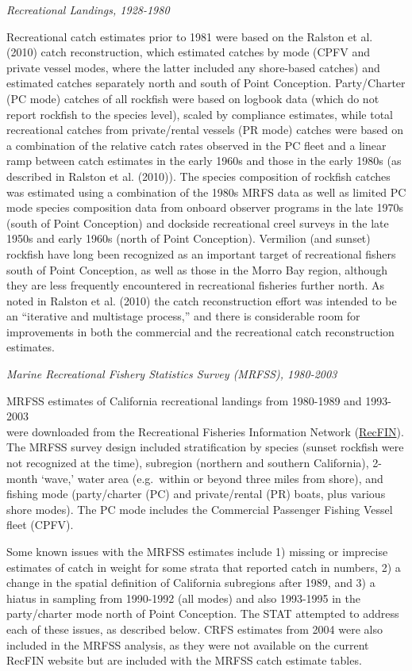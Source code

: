 \documentclass[
  english,
  a4paper,
]{article}
\begin{document}
\emph{Recreational Landings, 1928-1980}

Recreational catch estimates prior to 1981 were based on the Ralston et al. (2010) catch reconstruction, which estimated catches by mode (CPFV and private vessel modes, where the latter included any shore-based catches) and estimated catches separately north and south of Point Conception. Party/Charter (PC mode) catches of all rockfish were based on logbook data (which do not report rockfish to the species level), scaled by compliance estimates, while total recreational catches from private/rental vessels (PR mode) catches were based on a combination of the relative catch rates observed in the PC fleet and a linear ramp between catch estimates in the early 1960s and those in the early 1980s (as described in Ralston et al. (2010)). The species composition of rockfish catches was estimated using a combination of the 1980s MRFS data as well as limited PC mode species composition data from onboard observer programs in the late 1970s (south of Point Conception) and dockside recreational creel surveys in the late 1950s and early 1960s (north of Point Conception). Vermilion (and sunset) rockfish have long been recognized as an important target of recreational fishers south of Point Conception, as well as those in the Morro Bay region, although they are less frequently encountered in recreational fisheries further north. As noted in Ralston et al. (2010) the catch reconstruction effort was intended to be an ``iterative and multistage process,'' and there is considerable room for improvements in both the commercial and the recreational catch reconstruction estimates.

\emph{Marine Recreational Fishery Statistics Survey (MRFSS), 1980-2003}

MRFSS estimates of California recreational landings from 1980-1989 and 1993-2003\\
were downloaded from the Recreational Fisheries Information Network
(\href{https://www.recfin.org/}{RecFIN}). The MRFSS survey design included stratification by
species (sunset rockfish were not recognized at the time), subregion (northern
and southern California), 2-month `wave,' water area (e.g.~within or beyond
three miles from shore), and fishing mode (party/charter (PC) and private/rental (PR) boats,
plus various shore modes). The PC mode includes the Commercial Passenger Fishing Vessel
fleet (CPFV).

Some known issues with the MRFSS estimates include 1) missing or imprecise estimates of catch
in weight for some strata that reported catch in numbers, 2) a change in the
spatial definition of California subregions after 1989, and 3) a hiatus in
sampling from 1990-1992 (all modes) and also 1993-1995 in the party/charter mode
north of Point Conception. The STAT attempted to address each of these issues,
as described below. CRFS estimates from 2004 were also included in the MRFSS
analysis, as they were not available on the current RecFIN website but are
included with the MRFSS catch estimate tables.
\end{document}
